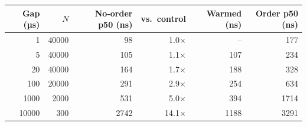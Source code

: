\begin{tabular}{rrrrrr}\hline Gap (µs) & $N$ & No-order p50 (ns) & vs.\ control & Warmed (ns) & Order p50 (ns)\\\hline
1 & 40000 & 98 & 1.0$\times$ & -- & 177\\
5 & 40000 & 105 & 1.1$\times$ & 107 & 234\\
20 & 40000 & 164 & 1.7$\times$ & 188 & 328\\
100 & 20000 & 291 & 2.9$\times$ & 254 & 634\\
1000 & 2000 & 531 & 5.0$\times$ & 394 & 1714\\
10000 & 300 & 2742 & 14.1$\times$ & 1188 & 3291\\
\hline\end{tabular}